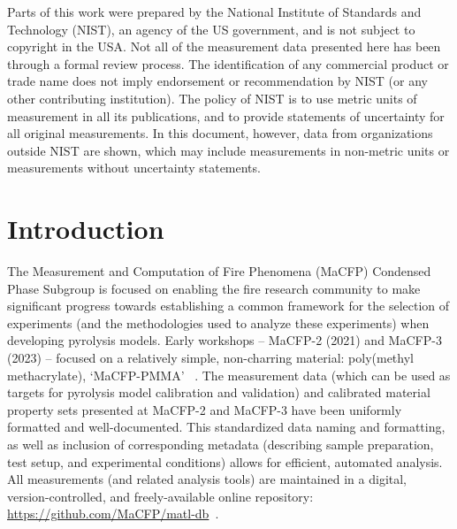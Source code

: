 \documentclass{article}
\begin{document}
	Parts of this work were prepared by the National Institute of Standards and Technology (NIST), an agency of the US government, and is not subject to copyright in the USA. Not all of the measurement data presented here has been through a formal review process. The identification of any commercial product or trade name does not imply endorsement or recommendation by NIST (or any other contributing institution). The policy of NIST is to use metric units of measurement in all its publications, and to provide statements of uncertainty for all original measurements. In this document, however, data from organizations outside NIST are shown, which may include measurements in non-metric units or measurements without uncertainty statements.
	
	
	
	\newpage
	\tableofcontents
\clearpage	
	\pagestyle{fancy}


\section{Introduction}

The Measurement and Computation of Fire Phenomena (MaCFP) Condensed Phase Subgroup is focused on enabling the fire research community to make significant progress towards establishing a common framework for the selection of experiments (and the methodologies used to analyze these experiments) when developing pyrolysis models. Early workshops -- MaCFP-2 (2021) and MaCFP-3 (2023) -- focused on a relatively simple, non-charring material: poly(methyl methacrylate), `MaCFP-PMMA' ~\cite{MaCFP2ExpSummary, MaCFP3Proceedings}. 
The measurement data (which can be used as targets for pyrolysis model calibration and validation) and calibrated material property sets presented at MaCFP-2 and MaCFP-3 have been uniformly formatted and well-documented. This standardized data naming and formatting, as well as inclusion of corresponding metadata (describing sample preparation, test setup, and experimental conditions) allows for efficient, automated analysis. All measurements (and related analysis tools) are maintained in a digital, version-controlled, and freely-available online repository: \url{https://github.com/MaCFP/matl-db}~\cite{MaCFP-cond-db}.
\end{document}
